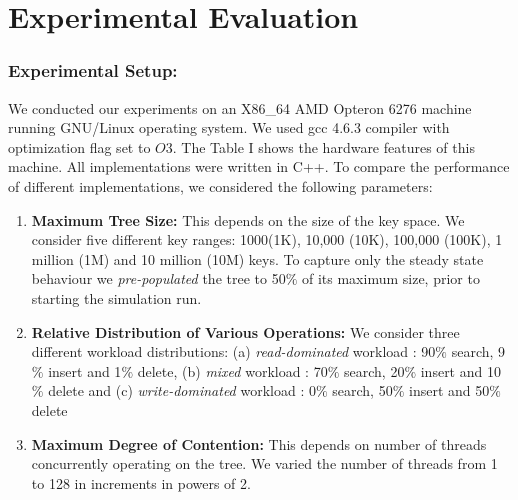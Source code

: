 \section{Experimental Evaluation}
\subsubsection{Experimental Setup:} We conducted our experiments on an X86\_64 AMD Opteron 6276 machine running GNU/Linux operating system. We used gcc 4.6.3 compiler with optimization flag set to $O3$. The Table I shows the hardware features of this machine. All implementations were written in C++. To compare the performance of different implementations, we considered the following parameters:
\begin{enumerate}
\item \textbf{Maximum Tree Size:} This depends on the size of the key space. We consider five different key ranges: 1000(1K), 10,000 (10K), 100,000 (100K), 1 million (1M) and 10 million (10M) keys. To capture only the steady state behaviour we \textit{pre-populated} the tree to 50$\%$ of its maximum size, prior to starting the simulation run.
\item \textbf{Relative Distribution of Various Operations:} We consider three different workload  distributions: (a) \textit{read-dominated} workload : 90$\%$ search, 9$\%$ insert and 1$\%$ delete, (b) \textit{mixed} workload : 70$\%$ search, 20$\%$ insert and 10$\%$ delete and (c) \textit{write-dominated} workload : 0$\%$ search, 50$\%$ insert and 50$\%$ delete
\item \textbf{Maximum Degree of Contention:} This depends on number of threads concurrently operating on the tree. We varied the number of threads from 1 to 128 in increments in powers of 2.
\end{enumerate}
